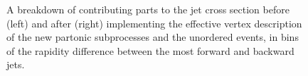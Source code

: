 \begin{figure}[H]
\caption{A breakdown of contributing parts to the jet cross section before (left) and after (right) implementing the effective vertex description of the new partonic subprocesses and the unordered events, in bins of the rapidity difference between the most forward and backward jets.}
\label{fig:fklmigration3}
\end{figure}


